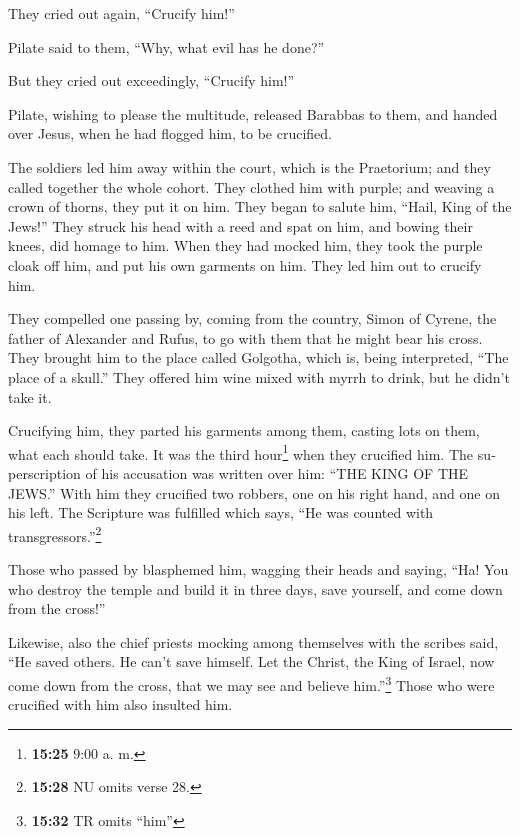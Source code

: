 \begin{paracol}{2}
\begin{otherlanguage}{english}
 They cried out again, ``Crucify him!''

 Pilate said to them, ``Why, what evil has he done?''

But they cried out exceedingly, ``Crucify him!''

 Pilate, wishing to please the multitude, released
Barabbas to them, and handed over Jesus, when he had flogged him, to be
crucified.

 The soldiers led him away within the court, which is the
Praetorium; and they called together the whole cohort. 
They clothed him with purple; and weaving a crown of thorns, they put it
on him.  They began to salute him, ``Hail, King of the
Jews!''  They struck his head with a reed and spat on
him, and bowing their knees, did homage to him.  When
they had mocked him, they took the purple cloak off him, and put his own
garments on him. They led him out to crucify him.

 They compelled one passing by, coming from the country,
Simon of Cyrene, the father of Alexander and Rufus, to go with them that
he might bear his cross.  They brought him to the place
called Golgotha, which is, being interpreted, ``The place of a skull.''
 They offered him wine mixed with myrrh to drink, but he
didn't take it.

 Crucifying him, they parted his garments among them,
casting lots on them, what each should take.  It was the
third hour\footnote{\textbf{15:25} 9:00 a. m.} when they crucified him.
 The superscription of his accusation was written over
him: ``THE KING OF THE JEWS.''  With him they crucified
two robbers, one on his right hand, and one on his left. 
The Scripture was fulfilled which says, ``He was counted with
transgressors.''\footnote{\textbf{15:28} NU omits verse 28.}

 Those who passed by blasphemed him, wagging their heads
and saying, ``Ha! You who destroy the temple and build it in three days,
 save yourself, and come down from the cross!''

 Likewise, also the chief priests mocking among
themselves with the scribes said, ``He saved others. He can't save
himself.  Let the Christ, the King of Israel, now come
down from the cross, that we may see and believe him.''\footnote{\textbf{15:32}
  TR omits ``him''} Those who were crucified with him also insulted him.


\end{otherlanguage}
\end{paracol}
